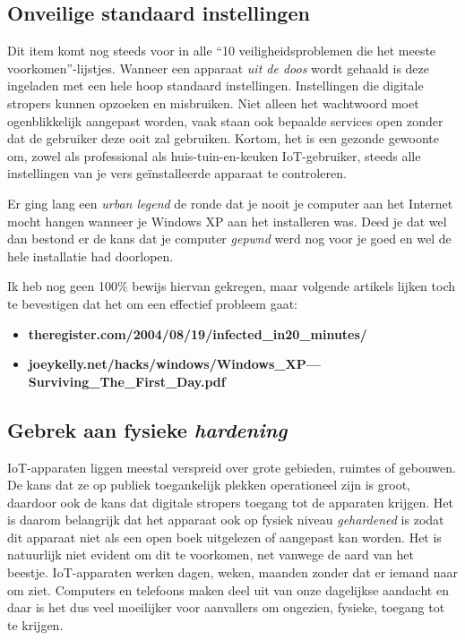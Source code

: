 \documentclass[
  10pt,
  dutch,
  paper=a4,
  ,captions=tableheading
]{scrbook}
\providecommand{\tightlist}{%
  \setlength{\itemsep}{0pt}\setlength{\parskip}{0pt}}
\begin{document}
\subsection{Onveilige standaard
instellingen}\label{onveilige-standaard-instellingen}

Dit item komt nog steeds voor in alle ``10 veiligheidsproblemen die het
meeste voorkomen''-lijstjes. Wanneer een apparaat \emph{uit de doos}
wordt gehaald is deze ingeladen met een hele hoop standaard
instellingen. Instellingen die digitale stropers kunnen opzoeken en
misbruiken. Niet alleen het wachtwoord moet ogenblikkelijk aangepast
worden, vaak staan ook bepaalde services open zonder dat de gebruiker
deze ooit zal gebruiken. Kortom, het is een gezonde gewoonte om, zowel
als professional als huis-tuin-en-keuken IoT-gebruiker, steeds alle
instellingen van je vers geïnstalleerde apparaat te controleren.

\begin{noteblock}
Er ging lang een \emph{urban legend} de ronde dat je nooit je computer
aan het Internet mocht hangen wanneer je Windows XP aan het installeren
was. Deed je dat wel dan bestond er de kans dat je computer
\emph{gepwnd} werd nog voor je goed en wel de hele installatie had
doorlopen.

Ik heb nog geen 100\% bewijs hiervan gekregen, maar volgende artikels
lijken toch te bevestigen dat het om een effectief probleem gaat:

\begin{itemize}
\tightlist
\item
  \textbf{theregister.com/2004/08/19/infected\_in20\_minutes/}
\item
  \textbf{joeykelly.net/hacks/windows/Windows\_XP---Surviving\_The\_First\_Day.pdf}
\end{itemize}

\end{noteblock}

\subsection{\texorpdfstring{Gebrek aan fysieke
\emph{hardening}}{Gebrek aan fysieke hardening}}\label{gebrek-aan-fysieke-hardening}

IoT-apparaten liggen meestal verspreid over grote gebieden, ruimtes of
gebouwen. De kans dat ze op publiek toegankelijk plekken operationeel
zijn is groot, daardoor ook de kans dat digitale stropers toegang tot de
apparaten krijgen. Het is daarom belangrijk dat het apparaat ook op
fysiek niveau \emph{gehardened} is zodat dit apparaat niet als een open
boek uitgelezen of aangepast kan worden. Het is natuurlijk niet evident
om dit te voorkomen, net vanwege de aard van het beestje. IoT-apparaten
werken dagen, weken, maanden zonder dat er iemand naar om ziet.
Computers en telefoons maken deel uit van onze dagelijkse aandacht en
daar is het dus veel moeilijker voor aanvallers om ongezien, fysieke,
toegang tot te krijgen.
\end{document}
